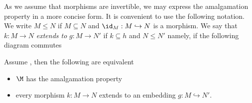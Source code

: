 \hfil{}

As we assume that morphisms are invertible, we may express the amalgamation property in a more concise form.
It is convenient to use the following notation.
We write \emph{$M\le N$\/} if $M\subseteq N$ and $\id_M:M\hookrightarrow N$ is a morphism.
We say that $k:M\to N$ \emph{extends to\/} $g:M\to N'$ if $k\subseteq h$ and  $N\le N'$ namely, if the following diagram commutes

\hfil{}

\begin{proposition}\label{prop_amalgamation_def}
Assume , then the following are equivalent
\begin{itemize}
\item[1.] $\M$ has the amalgamation property
\item[2.] every morphism $k:M\to N$ extends to an embedding $g : M\hookrightarrow N'$.
\end{itemize}
\end{proposition}

